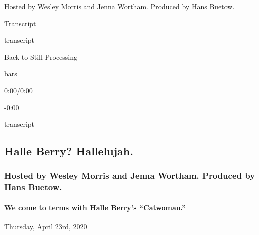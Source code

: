Hosted by Wesley Morris and Jenna Wortham. Produced by Hans Buetow.

Transcript

transcript

Back to Still Processing

bars

0:00/0:00

-0:00

transcript

\hypertarget{halle-berry-hallelujah-2}{%
\subsection{Halle Berry? Hallelujah.}\label{halle-berry-hallelujah-2}}

\hypertarget{hosted-by-wesley-morris-and-jenna-wortham-produced-by-hans-buetow-1}{%
\subsubsection{Hosted by Wesley Morris and Jenna Wortham. Produced by
Hans
Buetow.}\label{hosted-by-wesley-morris-and-jenna-wortham-produced-by-hans-buetow-1}}

\hypertarget{we-come-to-terms-with-halle-berrys-catwoman-2}{%
\paragraph{We come to terms with Halle Berry's
``Catwoman.''}\label{we-come-to-terms-with-halle-berrys-catwoman-2}}

Thursday, April 23rd, 2020

